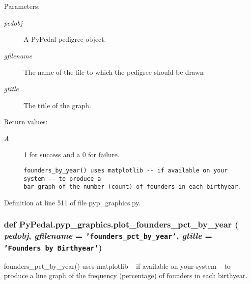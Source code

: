 \begin{Desc}
\item[Parameters:]
\begin{description}
\item[{\em pedobj}]A Py\-Pedal pedigree object. \item[{\em gfilename}]The name of the file to which the pedigree should be drawn \item[{\em gtitle}]The title of the graph. \end{description}
\end{Desc}
\begin{Desc}
\item[Return values:]
\begin{description}
\item[{\em A}]1 for success and a 0 for failure.

\footnotesize\begin{verbatim}founders_by_year() uses matplotlib -- if available on your system -- to produce a
bar graph of the number (count) of founders in each birthyear.
\end{verbatim}
\normalsize
 \end{description}
\end{Desc}


Definition at line 511 of file pyp\_\-graphics.py.\hypertarget{namespacePyPedal_1_1pyp__graphics_48dcfef58e6a02924d822a5f8b9e69de}{
\subsubsection[plot\_\-founders\_\-pct\_\-by\_\-year]{\setlength{\rightskip}{0pt plus 5cm}def Py\-Pedal.pyp\_\-graphics.plot\_\-founders\_\-pct\_\-by\_\-year ( {\em pedobj},  {\em gfilename} = {\tt 'founders\_\-pct\_\-by\_\-year'},  {\em gtitle} = {\tt 'Founders~by~Birthyear'})}}
\label{namespacePyPedal_1_1pyp__graphics_48dcfef58e6a02924d822a5f8b9e69de}


founders\_\-pct\_\-by\_\-year() uses matplotlib -- if available on your system -- to produce a line graph of the frequency (percentage) of founders in each birthyear. 

